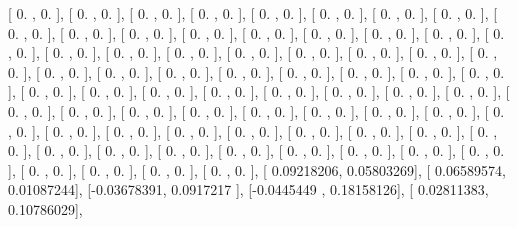\documentclass{article}
\begin{document}
       [ 0.        ,  0.        ],
       [ 0.        ,  0.        ],
       [ 0.        ,  0.        ],
       [ 0.        ,  0.        ],
       [ 0.        ,  0.        ],
       [ 0.        ,  0.        ],
       [ 0.        ,  0.        ],
       [ 0.        ,  0.        ],
       [ 0.        ,  0.        ],
       [ 0.        ,  0.        ],
       [ 0.        ,  0.        ],
       [ 0.        ,  0.        ],
       [ 0.        ,  0.        ],
       [ 0.        ,  0.        ],
       [ 0.        ,  0.        ],
       [ 0.        ,  0.        ],
       [ 0.        ,  0.        ],
       [ 0.        ,  0.        ],
       [ 0.        ,  0.        ],
       [ 0.        ,  0.        ],
       [ 0.        ,  0.        ],
       [ 0.        ,  0.        ],
       [ 0.        ,  0.        ],
       [ 0.        ,  0.        ],
       [ 0.        ,  0.        ],
       [ 0.        ,  0.        ],
       [ 0.        ,  0.        ],
       [ 0.        ,  0.        ],
       [ 0.        ,  0.        ],
       [ 0.        ,  0.        ],
       [ 0.        ,  0.        ],
       [ 0.        ,  0.        ],
       [ 0.        ,  0.        ],
       [ 0.        ,  0.        ],
       [ 0.        ,  0.        ],
       [ 0.        ,  0.        ],
       [ 0.        ,  0.        ],
       [ 0.        ,  0.        ],
       [ 0.        ,  0.        ],
       [ 0.        ,  0.        ],
       [ 0.        ,  0.        ],
       [ 0.        ,  0.        ],
       [ 0.        ,  0.        ],
       [ 0.        ,  0.        ],
       [ 0.        ,  0.        ],
       [ 0.        ,  0.        ],
       [ 0.        ,  0.        ],
       [ 0.        ,  0.        ],
       [ 0.        ,  0.        ],
       [ 0.        ,  0.        ],
       [ 0.        ,  0.        ],
       [ 0.        ,  0.        ],
       [ 0.        ,  0.        ],
       [ 0.        ,  0.        ],
       [ 0.        ,  0.        ],
       [ 0.        ,  0.        ],
       [ 0.        ,  0.        ],
       [ 0.        ,  0.        ],
       [ 0.        ,  0.        ],
       [ 0.        ,  0.        ],
       [ 0.        ,  0.        ],
       [ 0.        ,  0.        ],
       [ 0.        ,  0.        ],
       [ 0.        ,  0.        ],
       [ 0.        ,  0.        ],
       [ 0.        ,  0.        ],
       [ 0.        ,  0.        ],
       [ 0.        ,  0.        ],
       [ 0.        ,  0.        ],
       [ 0.        ,  0.        ],
       [ 0.09218206,  0.05803269],
       [ 0.06589574,  0.01087244],
       [-0.03678391,  0.0917217 ],
       [-0.0445449 ,  0.18158126],
       [ 0.02811383,  0.10786029],
\end{document}
